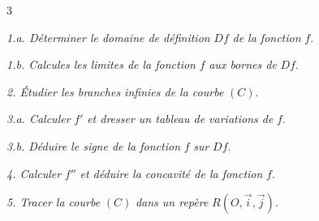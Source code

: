 \documentclass[a4paper,landscape]{article}
\begin{document}
\begin{multicols}{3}
\vspace{1mm}

\textit{1.a. Déterminer le domaine de définition} $Df$ \textit{de la fonction} $f$.

\textit{1.b. Calcules les limites de la fonction} $f$ \textit{aux bornes de} $Df$.

\textit{2. Étudier les branches infinies de la courbe} $(C)$.

\textit{3.a. Calculer} $f'$ \textit{et dresser un tableau de variations de} $f$.

\textit{3.b. Déduire le signe de la fonction} $f$ \textit{sur} $Df$.

\textit{4. Calculer} $f''$ \textit{et déduire la concavité de la fonction} $f$.

\textit{5. Tracer la courbe} $(C)$ \textit{dans un repère} $R(O,\vec{i},\vec{j})$.

\end{multicols}
\end{document}
